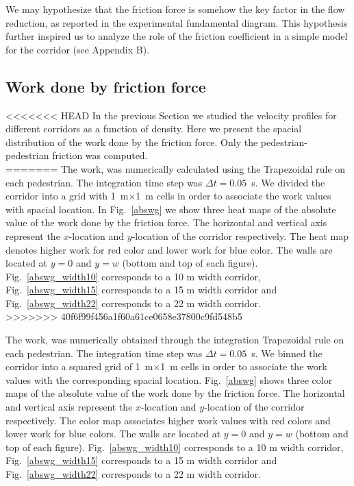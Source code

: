 We may hypothesize that the friction force is somehow the key factor in the
flow reduction, as reported in the experimental fundamental diagram. This hypothesis further inspired us to analyze the role of the friction coefficient in a simple model for the corridor (see Appendix B). 

\subsection{Work done by friction force}

<<<<<<< HEAD
In the previous Section we studied the velocity profiles for different corridors as a function of density. Here we present the spacial distribution of the work done by the friction force. Only the pedestrian-pedestrian friction was computed.\\
=======
The work, was numerically calculated using the Trapezoidal rule on each pedestrian. The integration time step was $\Delta t = 0.05$~s. We divided the corridor into a grid with 1~m$\times$1~m cells in order to associate the work values with spacial location. In Fig.~\ref{abswg} we show three heat maps of the absolute value of the work done by the friction force. The horizontal and vertical axis represent the $x$-location and $y$-location of the corridor respectively. The heat map denotes higher work for red color and lower work for blue color. The walls are located at $y=0$ and $y=w$ (bottom and top of each figure). Fig.~\ref{abswg_width10} corresponds to a 10 m width corridor, Fig.~\ref{abswg_width15} corresponds to a 15 m width corridor and Fig.~\ref{abswg_width22} corresponds to a 22 m width corridor.\\
>>>>>>> 40f6f99f456a1f60a61ce0658e37800c9fd548b5

The work, was numerically obtained through the integration Trapezoidal rule on each pedestrian. The integration time step was $\Delta t = 0.05$~s. We binned the corridor into a squared grid of 1~m$\times$1~m cells in order to associate the work values with the corresponding spacial location. Fig.~\ref{abswg} shows three color maps of the absolute value of the work done by the friction force. The horizontal and vertical axis represent the $x$-location and $y$-location of the corridor respectively. The color map associates higher work values with red colors and lower work for blue colors. The walls are located at $y=0$ and $y=w$ (bottom and top of each figure). Fig.~\ref{abswg_width10} corresponds to a 10 m width corridor, Fig.~\ref{abswg_width15} corresponds to a 15 m width corridor and Fig.~\ref{abswg_width22} corresponds to a 22 m width corridor.\\

